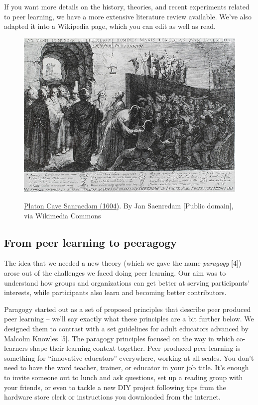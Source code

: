 If you want more details on the history, theories, and recent
experiments related to peer learning, we have a more extensive
literature review available. We've also adapted it into a Wikipedia
page, which you can edit as well as read.

\begin{figure}
\begin{center}
\href{http://commons.wikimedia.org/wiki/File:Platon\_Cave\_Sanraedam\_1604.jpg}{\includegraphics[width=.8\textwidth]{../pictures/plato_cave.jpg}}
\end{center}
\caption*{\href{http://commons.wikimedia.org/w/index.php?title=File:Platon\_Cave\_Sanraedam\_1604.jpg\&oldid=68567627}{Platon Cave Sanraedam (1604)}. By Jan Saenredam {[}Public domain{]}, via
Wikimedia Commons}
\end{figure}

\subsection{From peer learning to peeragogy}

The idea that we needed a new theory (which we gave the name
\emph{paragogy} {[}4{]}) arose out of the challenges we faced doing peer
learning. Our aim was to understand how groups and organizations can get
better at serving participants' interests, while participants also learn
and becoming better contributors.

Paragogy started out as a set of proposed principles that describe peer
produced peer learning -- we'll say exactly what these principles are a
bit further below. We designed them to contrast with a set guidelines
for adult educators advanced by Malcolm Knowles {[}5{]}. The paragogy
principles focused on the way in which co-learners shape their learning
context together. Peer produced peer learning is something for
``innovative educators'' everywhere, working at all scales. You don't
need to have the word teacher, trainer, or educator in your job title.
It's enough to invite someone out to lunch and ask questions, set up a
reading group with your friends, or even to tackle a new DIY project
following tips from the hardware store clerk or instructions you
downloaded from the internet.

